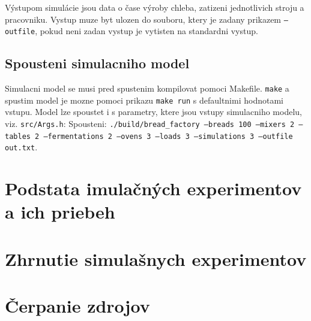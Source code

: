 \documentclass[a4paper, 10pt]{article}
\begin{document}
    Výstupom simulácie jsou data o čase výroby chleba, zatizeni jednotlivich stroju a pracovniku.
    Vystup muze byt ulozen do souboru, ktery je zadany prikazem \texttt{--outfile}, pokud neni zadan
    vystup je vytisten na standardni vystup.

    \subsection{Spousteni simulacniho model}\label{subsec:spousteni-simulacniho-model}
    Simulacni model se musi pred spustenim kompilovat pomoci Makefile.
    \texttt{make} a spustim model je mozne pomoci prikazu \texttt{make run} s defaultnimi hodnotami vstupu.
    Model lze spoustet i s parametry, ktere jsou vstupy simulacniho modelu, viz. \texttt{src/Args.h}:
    Spousteni: \texttt{./build/bread\_factory --breads 100 --mixers 2 --tables 2
    --fermentations 2 --ovens 3 --loads 3 --simulations 3 --outfile out.txt}.


    \section{Podstata imulačných experimentov a ich priebeh}


    \section{Zhrnutie simulašnych experimentov}

    \section {Čerpanie zdrojov}
    {\cite{example}}

    \newpage
    
    
\end{document}
